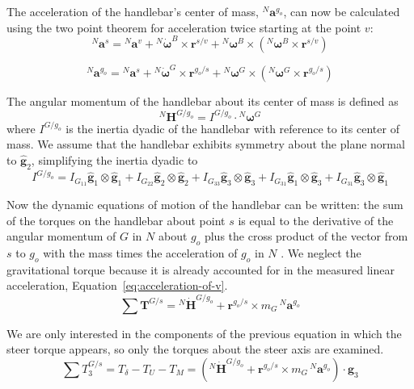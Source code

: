 \documentclass[10pt]{article}
\begin{document}
The acceleration of the handlebar's center of mass, $^N\mathbf{a}^{g_o}$, can
now be calculated using the two point theorem for acceleration \cite{Kane1985}
twice starting at the point $v$:
%
\begin{equation}
  ^N\mathbf{a}^s = {}^N\mathbf{a}^v +
    {}^N\dot{\boldsymbol{\omega}}^B\times\mathbf{r}^{s/v} +
    {}^N\boldsymbol{\omega}^B\times({}^N\boldsymbol{\omega}^B\times\mathbf{r}^{s/v})
\end{equation}

\begin{equation}
  ^N\mathbf{a}^{g_o} = {}^N\mathbf{a}^s +
    {}^N\dot{\boldsymbol{\omega}}^G\times\mathbf{r}^{g_o/s} +
    {}^N\boldsymbol{\omega}^G\times({}^N\boldsymbol{\omega}^G\times\mathbf{r}^{g_o/s})
\end{equation}

The angular momentum of the handlebar about its center of mass is defined as
%
\begin{equation}
  ^N\mathbf{H}^{G/g_o} = I^{G/g_o} \cdot {}^N\boldsymbol{\omega}^G
\end{equation}
%
where $I^{G/g_o}$ is the inertia dyadic of the handlebar with reference to its
center of mass. We assume that the handlebar exhibits symmetry about the plane
normal to $\hat{\mathbf{g}}_2$, simplifying the inertia dyadic to
%
\begin{equation}
  I^{G/g_o} =
    I_{G_{11}} \hat{\mathbf{g}}_1 \otimes \hat{\mathbf{g}}_1 +
    I_{G_{22}} \hat{\mathbf{g}}_2 \otimes \hat{\mathbf{g}}_2 +
    I_{G_{33}} \hat{\mathbf{g}}_3 \otimes \hat{\mathbf{g}}_3 +
    I_{G_{31}} \hat{\mathbf{g}}_1 \otimes \hat{\mathbf{g}}_3 +
    I_{G_{31}} \hat{\mathbf{g}}_3 \otimes \hat{\mathbf{g}}_1
\end{equation}

Now the dynamic equations of motion of the handlebar can be written: the sum of
the torques on the handlebar about point $s$ is equal to the derivative of the
angular momentum of $G$ in $N$ about $g_o$ plus the cross product of the vector
from $s$ to $g_o$ with the mass times the acceleration of $g_o$ in $N$
\cite{Meriam1975}. We neglect the gravitational torque because it is already
accounted for in the measured linear acceleration,
Equation~\ref{eq:acceleration-of-v}.
%
\begin{equation}
  \sum \mathbf{T}^{G/s} = {}^N\dot{\mathbf{H}}^{G/g_o} +
    \mathbf{r}^{g_o/s} \times m_G\,{}^N\mathbf{a}^{g_o}
\end{equation}

We are only interested in the components of the previous equation in which the
steer torque appears, so only the torques about the steer axis are examined.
%
\begin{equation}
  \sum T^{G/s}_3 = T_\delta - T_U - T_M = \left({}^N\dot{\mathbf{H}}^{G/g_o} +
  \mathbf{r}^{g_o/s} \times m_G\,{}^N\mathbf{a}^{g_o}\right) \cdot \hat{\mathbf{g}}_3
\end{equation}
\end{document}
